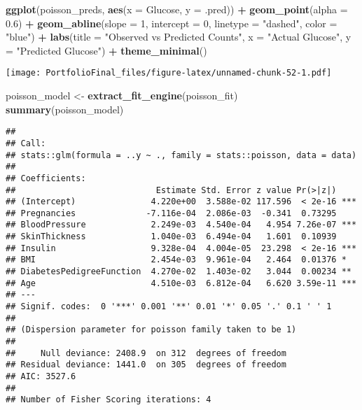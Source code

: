 \documentclass[
]{article}
\newenvironment{Shaded}{\begin{snugshade}}{\end{snugshade}}
\newcommand{\AttributeTok}[1]{\textcolor[rgb]{0.13,0.29,0.53}{#1}}
\newcommand{\DecValTok}[1]{\textcolor[rgb]{0.00,0.00,0.81}{#1}}
\newcommand{\FloatTok}[1]{\textcolor[rgb]{0.00,0.00,0.81}{#1}}
\newcommand{\FunctionTok}[1]{\textcolor[rgb]{0.13,0.29,0.53}{\textbf{#1}}}
\newcommand{\NormalTok}[1]{#1}
\newcommand{\OtherTok}[1]{\textcolor[rgb]{0.56,0.35,0.01}{#1}}
\newcommand{\SpecialCharTok}[1]{\textcolor[rgb]{0.81,0.36,0.00}{\textbf{#1}}}
\newcommand{\StringTok}[1]{\textcolor[rgb]{0.31,0.60,0.02}{#1}}
\begin{document}
\begin{Shaded}
\begin{Highlighting}[]
\FunctionTok{ggplot}\NormalTok{(poisson\_preds, }\FunctionTok{aes}\NormalTok{(}\AttributeTok{x =}\NormalTok{ Glucose, }\AttributeTok{y =}\NormalTok{ .pred)) }\SpecialCharTok{+}
  \FunctionTok{geom\_point}\NormalTok{(}\AttributeTok{alpha =} \FloatTok{0.6}\NormalTok{) }\SpecialCharTok{+}
  \FunctionTok{geom\_abline}\NormalTok{(}\AttributeTok{slope =} \DecValTok{1}\NormalTok{, }\AttributeTok{intercept =} \DecValTok{0}\NormalTok{, }\AttributeTok{linetype =} \StringTok{"dashed"}\NormalTok{, }\AttributeTok{color =} \StringTok{"blue"}\NormalTok{) }\SpecialCharTok{+}
  \FunctionTok{labs}\NormalTok{(}\AttributeTok{title =} \StringTok{"Observed vs Predicted Counts"}\NormalTok{,}
       \AttributeTok{x =} \StringTok{"Actual Glucose"}\NormalTok{,}
       \AttributeTok{y =} \StringTok{"Predicted Glucose"}\NormalTok{) }\SpecialCharTok{+}
  \FunctionTok{theme\_minimal}\NormalTok{()}
\end{Highlighting}
\end{Shaded}

\texttt{[image: PortfolioFinal\_files/figure-latex/unnamed-chunk-52-1.pdf]}

\begin{Shaded}
\begin{Highlighting}[]
\NormalTok{poisson\_model }\OtherTok{\textless{}{-}} \FunctionTok{extract\_fit\_engine}\NormalTok{(poisson\_fit)}
\FunctionTok{summary}\NormalTok{(poisson\_model)}
\end{Highlighting}
\end{Shaded}

\begin{verbatim}
## 
## Call:
## stats::glm(formula = ..y ~ ., family = stats::poisson, data = data)
## 
## Coefficients:
##                            Estimate Std. Error z value Pr(>|z|)    
## (Intercept)               4.220e+00  3.588e-02 117.596  < 2e-16 ***
## Pregnancies              -7.116e-04  2.086e-03  -0.341  0.73295    
## BloodPressure             2.249e-03  4.540e-04   4.954 7.26e-07 ***
## SkinThickness             1.040e-03  6.494e-04   1.601  0.10939    
## Insulin                   9.328e-04  4.004e-05  23.298  < 2e-16 ***
## BMI                       2.454e-03  9.961e-04   2.464  0.01376 *  
## DiabetesPedigreeFunction  4.270e-02  1.403e-02   3.044  0.00234 ** 
## Age                       4.510e-03  6.812e-04   6.620 3.59e-11 ***
## ---
## Signif. codes:  0 '***' 0.001 '**' 0.01 '*' 0.05 '.' 0.1 ' ' 1
## 
## (Dispersion parameter for poisson family taken to be 1)
## 
##     Null deviance: 2408.9  on 312  degrees of freedom
## Residual deviance: 1441.0  on 305  degrees of freedom
## AIC: 3527.6
## 
## Number of Fisher Scoring iterations: 4
\end{verbatim}
\end{document}
